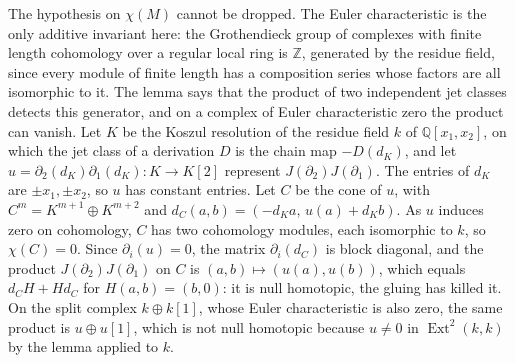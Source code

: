 \documentclass[11pt,reqno]{amsart}
\theoremstyle{plain}
\theoremstyle{definition}
\theoremstyle{remark}
\newcommand{\QQ}{\mathbb{Q}}
\newcommand{\ZZ}{\mathbb{Z}}
\DeclareMathOperator{\Ext}{Ext}
\begin{document}
The hypothesis on $\chi(M)$ cannot be dropped. The Euler characteristic is
the only additive invariant here: the Grothendieck group of complexes with
finite length cohomology over a regular local ring is $\ZZ$, generated by the
residue field, since every module of finite length has a composition series
whose factors are all isomorphic to it. The lemma says that the product of two
independent jet classes detects this generator, and on a complex of Euler
characteristic zero the product can vanish. Let $K$ be the Koszul resolution
of the residue field $k$ of $\QQ[x_{1},x_{2}]$, on which the jet class of a
derivation $D$ is the chain map $-D(d_{K})$, and let $u=\partial_{2}(d_{K})
\partial_{1}(d_{K})\colon K\to K[2]$ represent $J(\partial_{2})J(\partial_{1})$.
The entries of $d_{K}$ are $\pm x_{1},\pm x_{2}$, so $u$ has constant
entries. Let $C$ be the cone of $u$, with $C^{m}=K^{m+1}\oplus K^{m+2}$ and
$d_{C}(a,b)=(-d_{K}a,\,u(a)+d_{K}b)$. As $u$ induces zero on cohomology, $C$ has
two cohomology modules, each isomorphic to $k$, so $\chi(C)=0$. Since
$\partial_{i}(u)=0$, the matrix $\partial_{i}(d_{C})$ is block diagonal, and the
product $J(\partial_{2})J(\partial_{1})$ on $C$ is $(a,b)\mapsto(u(a),u(b))$,
which equals $d_{C}H+Hd_{C}$ for $H(a,b)=(b,0)$: it is null homotopic, the
gluing has killed it. On the split complex $k\oplus k[1]$, whose Euler
characteristic is also zero, the same product is $u\oplus u[1]$, which is not
null homotopic because $u\ne0$ in $\Ext^{2}(k,k)$ by the lemma applied to $k$.
\end{document}
